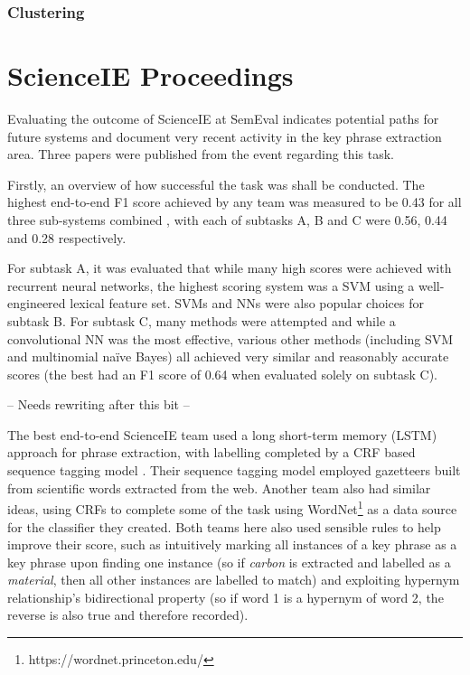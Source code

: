 \subsubsection*{Clustering}

\section{ScienceIE Proceedings}
Evaluating the outcome of ScienceIE at SemEval indicates potential paths for future systems and document very recent activity in the key phrase extraction area. Three papers were published from the event regarding this task.

Firstly, an overview of how successful the task was shall be conducted. The highest end-to-end F1 score achieved by any team was measured to be 0.43 for all three sub-systems combined \cite{Augenstein2017}, with each of subtasks A, B and C were 0.56, 0.44 and 0.28 respectively. 

For subtask A, it was evaluated that while many high scores were achieved with recurrent neural networks, the highest scoring system was a SVM using a well-engineered lexical feature set. SVMs and NNs were also popular choices for subtask B. For subtask C, many methods were attempted and while a convolutional NN was the most effective, various other methods (including SVM and multinomial naïve Bayes) all achieved very similar and reasonably accurate scores (the best had an F1 score of 0.64 when evaluated solely on subtask C).

-- Needs rewriting after this bit --

The best end-to-end ScienceIE team used a long short-term memory (LSTM) approach for phrase extraction, with labelling completed by a CRF based sequence tagging model \cite{Ammar2017}. Their sequence tagging model employed gazetteers built from scientific words extracted from the web. Another team \cite{Marsi2017} also had similar ideas, using CRFs to complete some of the task using WordNet\footnote{https://wordnet.princeton.edu/} as a data source for the classifier they created. Both teams here also used sensible rules to help improve their score, such as intuitively marking all instances of a key phrase as a key phrase upon finding one instance (so if \textit{carbon} is extracted and labelled as a \textit{material}, then all other instances are labelled to match) and exploiting hypernym relationship’s bidirectional property (so if word 1 is a hypernym of word 2, the reverse is also true and therefore recorded). 

